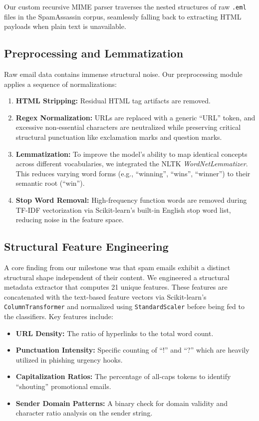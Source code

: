 \documentclass[sigconf]{acmart}
\begin{document}
Our custom recursive MIME parser traverses the nested structures of raw \texttt{.eml} files in the SpamAssassin corpus, seamlessly falling back to extracting HTML payloads when plain text is unavailable.

\subsection{Preprocessing and Lemmatization}
Raw email data contains immense structural noise. Our preprocessing module applies a sequence of normalizations:
\begin{enumerate}
    \item \textbf{HTML Stripping:} Residual HTML tag artifacts are removed.
    \item \textbf{Regex Normalization:} URLs are replaced with a generic ``URL'' token, and excessive non-essential characters are neutralized while preserving critical structural punctuation like exclamation marks and question marks.
    \item \textbf{Lemmatization:} To improve the model's ability to map identical concepts across different vocabularies, we integrated the NLTK \textit{WordNetLemmatizer}. This reduces varying word forms (e.g., ``winning'', ``wins'', ``winner'') to their semantic root (``win'').
    \item \textbf{Stop Word Removal:} High-frequency function words are removed during TF-IDF vectorization via Scikit-learn's built-in English stop word list, reducing noise in the feature space.
\end{enumerate}

\subsection{Structural Feature Engineering}
A core finding from our milestone was that spam emails exhibit a distinct structural shape independent of their content. We engineered a structural metadata extractor that computes 21 unique features. These features are concatenated with the text-based feature vectors via Scikit-learn's \texttt{ColumnTransformer} and normalized using \texttt{StandardScaler} before being fed to the classifiers. Key features include:
\begin{itemize}
    \item \textbf{URL Density:} The ratio of hyperlinks to the total word count.
    \item \textbf{Punctuation Intensity:} Specific counting of ``!'' and ``?'' which are heavily utilized in phishing urgency hooks.
    \item \textbf{Capitalization Ratios:} The percentage of all-caps tokens to identify ``shouting'' promotional emails.
    \item \textbf{Sender Domain Patterns:} A binary check for domain validity and character ratio analysis on the sender string.
\end{itemize}
\end{document}
